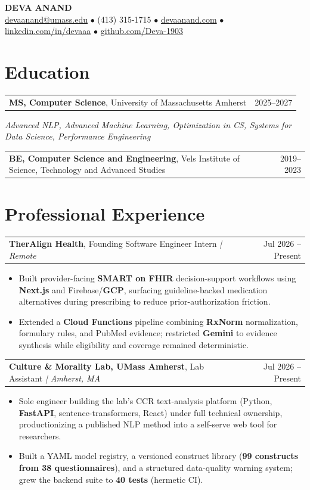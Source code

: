 \documentclass[letterpaper,11pt]{article}
\makeatletter
\newcommand{\eduItem}[3]{%
  \begin{tabular*}{\textwidth}{@{}l@{\extracolsep{\fill}}r@{}}
    \textbf{#1}, #2 & #3 \\
  \end{tabular*}\par
}
\newcommand{\expItem}[4]{%
  \vspace{2pt}
  \begin{tabular*}{\textwidth}{@{}l@{\extracolsep{\fill}}r@{}}
    \textbf{#1}, #2 \textit{| #3} & #4 \\
  \end{tabular*}\par\vspace{-3pt}
}
\makeatother
\begin{document}
\begin{center}
    {\fontsize{18}{20}\selectfont\bfseries DEVA ANAND}\\ \vspace{3pt}
    {\small
    \href{mailto:devaanand@umass.edu}{devaanand@umass.edu}
    \enspace$\bullet$\enspace
    (413) 315-1715
    \enspace$\bullet$\enspace
    \href{https://devaanand.com}{devaanand.com}
    \enspace$\bullet$\enspace
    \href{https://linkedin.com/in/devaaa/}{linkedin.com/in/devaaa}
    \enspace$\bullet$\enspace
    \href{https://github.com/Deva-1903}{github.com/Deva-1903}}
\end{center}
\vspace{-8pt}

\section{Education}
\eduItem{MS, Computer Science}{University of Massachusetts Amherst}{2025--2027}
{\small\textit{Advanced NLP, Advanced Machine Learning, Optimization in CS, Systems for Data Science, Performance Engineering}}\par
\vspace{3pt}
\eduItem{BE, Computer Science and Engineering}{Vels Institute of Science, Technology and Advanced Studies}{2019--2023}

\section{Professional Experience}

\expItem{TherAlign Health}{Founding Software Engineer Intern}{Remote}{Jul 2026 -- Present}
\begin{itemize}
  \item Built provider-facing \textbf{SMART on FHIR} decision-support workflows using \textbf{Next.js} and Firebase/\textbf{GCP}, surfacing guideline-backed medication alternatives during prescribing to reduce prior-authorization friction.
  \item Extended a \textbf{Cloud Functions} pipeline combining \textbf{RxNorm} normalization, formulary rules, and PubMed evidence; restricted \textbf{Gemini} to evidence synthesis while eligibility and coverage remained deterministic.
\end{itemize}

\expItem{Culture \& Morality Lab, UMass Amherst}{Lab Assistant}{Amherst, MA}{Jul 2026 -- Present}
\begin{itemize}
  \item Sole engineer building the lab's CCR text-analysis platform (Python, \textbf{FastAPI}, sentence-transformers, React) under full technical ownership, productionizing a published NLP method into a self-serve web tool for researchers.
  \item Built a YAML model registry, a versioned construct library (\textbf{99 constructs from 38 questionnaires}), and a structured data-quality warning system; grew the backend suite to \textbf{40 tests} (hermetic CI).
\end{itemize}
\end{document}
